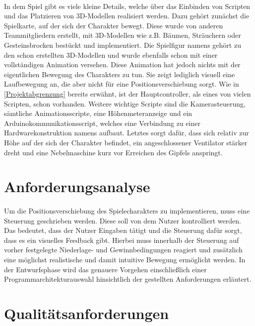 \paragraph{}
In dem Spiel gibt es viele kleine Details, welche über das Einbinden von Scripten und das Platzieren von 3D-Modellen realisiert werden. Dazu gehört zunächst die Spielkarte, auf der sich der Charakter bewegt. Diese wurde von anderen Teammitgliedern erstellt, mit 3D-Modellen wie z.B. Bäumen, Sträuchern oder Gesteinsbrocken bestückt und implementiert. 
Die Spielfigur namens  gehört zu den schon erstellten 3D-Modellen und wurde ebenfalls schon mit einer vollständigen Animation versehen. Diese Animation hat jedoch nichts mit der eigentlichen Bewegung des Charakters zu tun. Sie zeigt lediglich visuell eine Laufbewegung an, die aber nicht für eine Positionsverschiebung sorgt. 
Wie in \autoref{Projektabgrenzung}  bereits erwähnt, ist der Hauptcontroller, als eines von vielen Scripten, schon vorhanden. Weitere wichtige Scripte sind die Kamerasteuerung, sämtliche Animationsscripte, eine Höhenmeteranzeige und ein Arduinokommunikationsscript, welches eine Verbindung zu einer Hardwarekonstruktion namens  aufbaut. Letztes sorgt dafür, dass sich relativ zur Höhe auf der sich der Charakter befindet, ein angeschlossener Ventilator stärker dreht und eine Nebelmaschine kurz vor Erreichen des Gipfels anspringt.

\section{Anforderungsanalyse}
\paragraph{}
Um die Positionsverschiebung des Spielecharakters zu implementieren, muss eine Steuerung geschrieben werden. Diese soll von dem Nutzer kontrolliert werden. Das bedeutet, dass der Nutzer Eingaben tätigt und die Steuerung dafür sorgt, dass es ein visuelles Feedback gibt. Hierbei muss innerhalb der Steuerung auf vorher festgelegte Niederlage- und Gewinnbedingungen reagiert und zusätzlich eine möglichst realistische und damit intuitive Bewegung ermöglicht werden. In der Entwurfsphase wird das genauere Vorgehen einschließlich einer Programmarchitekturauswahl hinsichtlich der gestellten Anforderungen erläutert.

\section{Qualitätsanforderungen}
